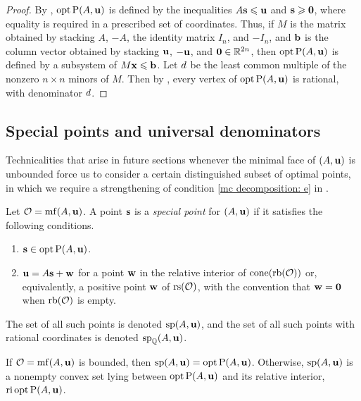 \documentclass{amsart}
\begin{document}
\begin{proof}
   By , $\operatorname{opt} \mathrm{P}(A,\mathbf{u})$ is defined by the inequalities $A\mathbf{s} \leqslant \mathbf{u}$ and $\mathbf{s}\geqslant \mathbf{0}$, where equality is required in a prescribed set of coordinates.
   Thus, if $M$ is the matrix obtained by stacking $A$, $-A$, the identity matrix $I_n$, and $-I_n$, and $\mathbf{b}$ is the column vector obtained by stacking $\mathbf{u}$, $-\mathbf{u}$, and $\mathbf{0}\in \mathbb{R}^{2n}$, then $\operatorname{opt} \mathrm{P}(A,\mathbf{u})$ is defined by a subsystem of $M \mathbf{x} \leqslant \mathbf{b}$.
   Let $d$ be the least common multiple of the nonzero $n\times n$ minors of $M$.
   Then by , every vertex of $\operatorname{opt} \mathrm{P}(A,\mathbf{u})$ is rational, with denominator $d$.
\end{proof}

\subsection{Special points and universal denominators}

Technicalities that arise in future sections whenever the minimal face of $(A, \mathbf{u})$ is unbounded force us to consider a certain distinguished subset of optimal points, in which we require a strengthening of condition \ref{mc decomposition: e} in .

\begin{definition}
   \label{mc: D}
   Let $\mathcal{O} = \operatorname{mf}(A, \mathbf{u})$.
   A point $\mathbf{s}$ is a \emph{special point} for $(A, \mathbf{u})$ if it satisfies the following conditions.
   \begin{enumerate}
      \item $\mathbf{s} \in \operatorname{opt} \mathrm{P}(A, \mathbf{u})$.
      \item \label{item: special condition of special points}
      $\mathbf{u} = A \mathbf{s} + \mathbf{w}$ for a point $\mathbf{w}$ in the relative interior of $\operatorname{cone}(\operatorname{rb}(\mathcal{O}))$ or, equivalently, a positive point $\mathbf{w}$ of $\operatorname{rs}(\mathcal{O})$, with the convention that $\mathbf{w}=\mathbf{0}$ when $\operatorname{rb}(\mathcal{O})$ is empty.
   \end{enumerate}
   The set of all such points is denoted $\operatorname{sp}(A, \mathbf{u})$, and the set of all such points with rational coordinates is denoted $\operatorname{sp}_{\mathbb{Q}}(A, \mathbf{u})$.
\end{definition}

\begin{proposition}
   \label{opt versus mc: P}
   If $\mathcal{O} = \operatorname{mf}(A, \mathbf{u})$ is bounded, then $\operatorname{sp}(A, \mathbf{u}) = \operatorname{opt} \mathrm{P}(A, \mathbf{u})$.
   Otherwise, $\operatorname{sp}(A, \mathbf{u})$ is a nonempty convex set lying between $\operatorname{opt} \mathrm{P}(A, \mathbf{u})$ and its relative interior, $\operatorname{ri} \operatorname{opt} \mathrm{P}(A, \mathbf{u})$.
\end{proposition}
\end{document}

